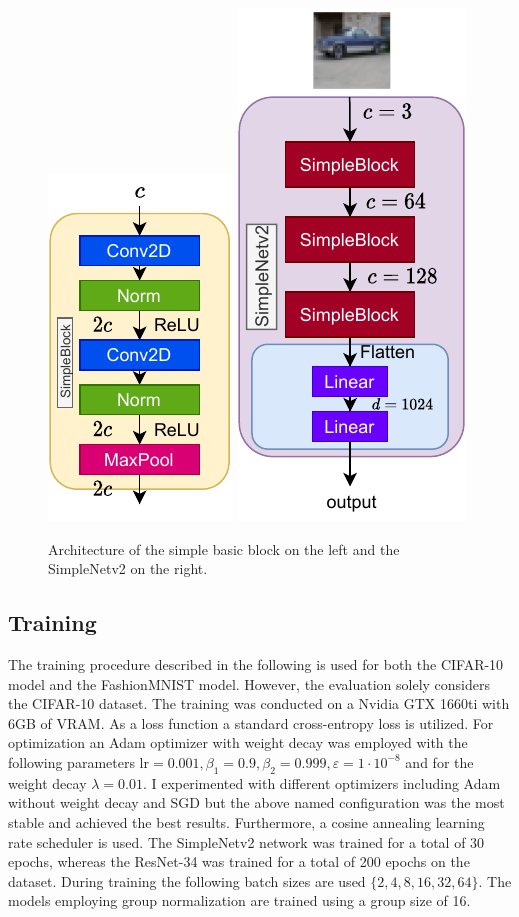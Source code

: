 \begin{figure}[h]
    \centering
    \includegraphics[width=.3\textwidth]{res/basicBlock.pdf}
    \includegraphics[width=.25\textwidth]{res/SimpleNetv2.pdf}
    \caption{Architecture of the simple basic block on the left and the SimpleNetv2 on the right.}
    \label{fig:simplenet}
\end{figure}

\subsection{Training}\label{subsec:training}
The training procedure described in the following is used for both the CIFAR-10 model and the FashionMNIST model.
However, the evaluation solely considers the CIFAR-10 dataset.
The training was conducted on a Nvidia GTX 1660ti with 6GB of VRAM.
As a loss function a standard cross-entropy loss is utilized.
For optimization an Adam optimizer with weight decay was employed with the following parameters $\text{lr}=0.001, \beta_1=0.9, \beta_2=0.999, \varepsilon=1\cdot 10^{-8}$ and for the weight decay $\lambda=0.01$.
I experimented with different optimizers including Adam without weight decay and SGD but the above named configuration was the most stable and achieved the best results.
Furthermore, a cosine annealing learning rate scheduler is used.
The SimpleNetv2 network was trained for a total of 30 epochs, whereas the ResNet-34 was trained for a total of 200 epochs on the dataset.
During training the following batch sizes are used $\{2, 4, 8, 16, 32, 64\}$.
The models employing group normalization are trained using a group size of 16.

